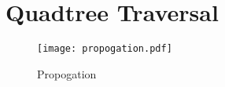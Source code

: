 
\section{Quadtree Traversal}
\label{sec:quadtree_traversal}

\begin{figure}[htpb]
	\centering
	\texttt{[image: propogation.pdf]}
	\caption{Propogation}
	\label{fig:propogation}
\end{figure}
